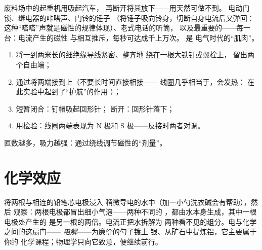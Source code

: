 \begin{example}[可开关的磁性无处不在]\label{ex:g8:electric-current-effects:uses}
废料场中的起重机用吸起汽车，
再断开将其放下——用天然可做不到。
电动门锁、继电器的咔嗒声、门铃的锤子
（将锤子吸向铃身，切断自身电流后又弹回：
这种“嗒嗒”声就是磁性的规律体现）、老式电话的听筒，
以及最重要的——每一台：电流产生的磁性
与相互推斥，每秒可达成千上万次。
是
电气时代的“肌肉”。
\end{example}

\begin{method}[绕制电磁铁]\label{met:g8:electric-current-effects:wind}
\begin{enumerate}
  \item 将一到两米长的细绝缘导线紧密、整齐地
        绕在一根大铁钉或螺栓上，
        留出两个自由端；
  \item 通过将两端接到上（不要长时间直接相接——
        线圈几乎相当于，会发热：
        在此实验中起到了“护航”的作用
        ）；
  \item 短暂闭合：钉帽吸起回形针；
        断开：回形针落下；
  \item 用检验：线圈两端表现为 N 极和
        S 极——反接时两者对调。
\end{enumerate}
匝数越多，吸力越强：通过绕线调节磁性的“剂量”。
\end{method}

\section{化学效应}

\begin{example}[水中的电流]\label{ex:g8:electric-current-effects:electrolysis}
将两根与相连的铅笔芯电极浸入
稍微导电的水中（加一小勺洗衣碱会有帮助），然后
观察：两根电极都冒出细小气泡——两种不同的
，都由水本身生成，其中一根电极处产生的
是另一根的两倍。电流正把水拆解为
两种看不见的组分。电与化学之间的这扇门——
\emph{电解}——为廉价的勺子镀上
银、从矿石中提炼铝，它主要属于你的
化学课程；物理学只向它致意，便继续前行。
\end{example}


